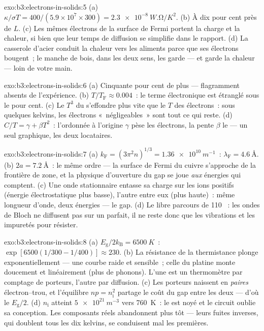 \begin{solution}{exo:b3:electrons-in-solids:5}
(a) $\kappa/\sigma T = 400/(5.9\times10^7\times300) =
\qty{2.3e-8}{W.\ohm/K^2}$. (b) À dix pour cent près de $L$. (c)
Les mêmes électrons de la surface de Fermi portent la charge et la
chaleur, si bien que leur temps de diffusion se simplifie dans le
rapport. (d) La casserole d'acier conduit la chaleur vers les
aliments parce que ses électrons bougent~; le manche de bois,
 dans les deux sens, les garde --- et garde la chaleur ---
loin de votre main.
\end{solution}

\begin{solution}{exo:b3:electrons-in-solids:6}
(a) Cinquante pour cent de plus --- flagramment absents de
l'expérience. (b) $T/T_{\text{F}} \approx 0.004$~: le terme
électronique est étranglé sous le pour cent. (c) Le $T^3$ du 
s'effondre plus vite que le $T$ des électrons~: sous quelques
kelvins, les électrons «~négligeables~» sont tout ce qui reste. (d) $C/T =
\gamma + \beta T^2$~: l'ordonnée à l'origine $\gamma$ pèse les
électrons, la pente $\beta$ le  --- un seul graphique, les
deux locataires.
\end{solution}

\begin{solution}{exo:b3:electrons-in-solids:7}
(a) $k_{\text{F}} = (3\pi^2n)^{1/3} = \qty{1.36e10}{m^{-1}}$~:
$\lambda_{\text{F}} = \qty{4.6}{\angstrom}$. (b) $2a =
\qty{7.2}{\angstrom}$~: le même ordre --- la surface de Fermi du
cuivre s'approche de la frontière de zone, et la physique
d'ouverture du gap se joue \emph{aux} énergies qui comptent. (c) Une
onde stationnaire entasse sa charge sur les ions positifs (énergie
électrostatique plus basse), l'autre entre eux (plus haute)~: même
longueur d'onde, deux énergies --- le gap. (d) Le libre parcours de
110 ~: les ondes de Bloch ne diffusent pas sur
un  parfait, il ne reste donc que les vibrations et les
impuretés pour résister.
\end{solution}

\begin{solution}{exo:b3:electrons-in-solids:8}
(a) $E_{\text{g}}/2k_{\text{B}} = \qty{6500}{K}$~:
$\exp[6500(1/300 - 1/400)] \approx 230$. (b) La résistance de la
thermistance plonge exponentiellement --- une courbe raide et
sensible~; celle du platine monte doucement et linéairement (plus de
phonons). L'une est un thermomètre par comptage de porteurs, l'autre
par diffusion. (c) Les porteurs naissent en \emph{paires}
électron--trou, et l'équilibre $np = n_{\text{i}}^2$ partage le coût
du gap entre les deux --- d'où le $E_{\text{g}}/2$. (d)
$n_{\text{i}}$ atteint $\qty{5e21}{m^{-3}}$ vers \qty{760}{K}~: le
 est noyé et le circuit oublie sa conception. Les composants
réels abandonnent plus tôt --- leurs fuites inverses, qui doublent
tous les dix kelvins, se conduisent mal les premières.
\end{solution}

